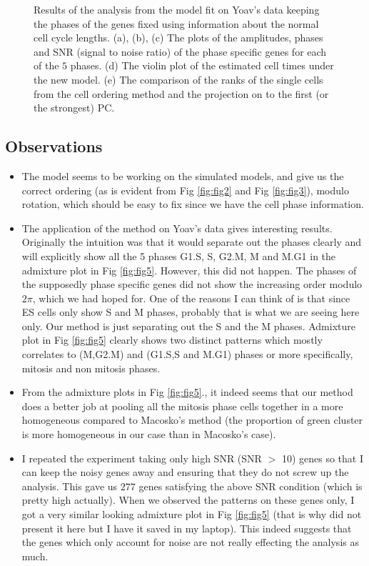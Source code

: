 \documentclass[11pt]{article}
\begin{document}
\begin{figure}[ht]
    \caption{Results of the analysis from the model fit on Yoav's data keeping the phases of the genes fixed using information about the normal cell cycle lengths. (a), (b), (c) The plots of the amplitudes, phases and SNR (signal to noise ratio) of the phase specific genes for each of the $5$ phases. (d) The violin plot of the estimated cell times under the new model. (e) The comparison of the ranks of the single cells from the cell ordering method and the projection on to the first (or the strongest) PC.}
 \label{fig:fig7}
 \end{figure}


\subsection{Observations}

\begin{itemize}
\item The model seems to be working on the simulated models, and give us the correct ordering (as is evident from Fig \ref{fig:fig2} and Fig \ref{fig:fig3}), modulo rotation, which should be easy to fix since we have the cell phase information.

\item The application of the method on Yoav's data gives interesting results. Originally the intuition was that it would separate out the phases clearly and will explicitly show all the 5 phases G1.S, S, G2.M, M and M.G1 in the admixture plot in Fig \ref{fig:fig5}. However, this did not happen. The phases of the supposedly phase specific genes did not show the increasing order modulo $2 \pi$, which we had hoped for. One of the reasons I can think of is that since ES cells only show S and M phases, probably that is what we are seeing here only. Our method is just separating out the S and the M phases. Admixture plot in Fig \ref{fig:fig5} clearly shows two distinct patterns which mostly correlates to (M,G2.M) and (G1.S,S and M.G1) phases or more specifically, mitosis and non mitosis phases. 

\item From the admixture plots in Fig \ref{fig:fig5}., it indeed seems that our method does a better job at pooling all the mitosis phase cells together in a more homogeneous compared to Macosko's method (the proportion of green cluster is more homogeneous in our case than in Macosko's case). 

\item I repeated the experiment taking only high SNR (SNR $>$ 10) genes so that I can keep the noisy genes away and ensuring that they do not screw up the analysis. This gave us $277$ genes satisfying the above SNR condition (which is pretty high actually). When we observed the patterns on these genes only, I got a very similar looking admixture plot in Fig \ref{fig:fig5} (that is why did not present it here but I have it saved in my laptop). This indeed suggests that the genes which only account for noise are not really effecting the analysis as much.


\end{itemize}
\end{document}

